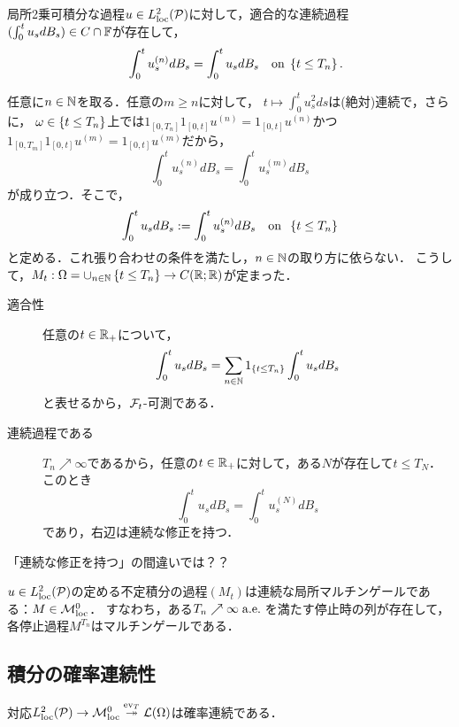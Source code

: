 \documentclass[uplatex,dvipdfmx]{jsreport}
\begin{document}
\begin{proposition}
    局所2乗可積分な過程$u\in L^2_{\mathrm{loc}}(\mathcal{P})$に対して，適合的な連続過程$(\int^t_0u_sdB_s)\in C\cap\mathbb{F}$が存在して，
    \[\quad\int^t_0u_s^{(n)}dB_s=\int^t_0u_sdB_s\quad\mathrm{on}\;\left\{t\le T_n\right\}.\]
\end{proposition}
\begin{Proof}
    任意に$n\in\mathbb{N}$を取る．任意の$m\ge n$に対して，
    $t\mapsto\int^t_0u_s^2ds$は(絶対)連続で，さらに，
    $\omega\in\left\{t\le T_n\right\}$上では$1_{[0,T_n]}1_{[0,t]}u^{(n)}=1_{[0,t]}u^{(n)}$かつ$1_{[0,T_m]}1_{[0,t]}u^{(m)}=1_{[0,t]}u^{(m)}$だから，
    \[\int^t_0u^{(n)}_sdB_s=\int^t_0u_s^{(m)}dB_s\]
    が成り立つ．そこで，
    \[\int^t_0u_sdB_s:=\int^t_0u_s^{(n)}dB_s\quad\mathrm{on}\;\;\left\{t\le T_n\right\}\]
    と定める．これ張り合わせの条件を満たし，$n\in\mathbb{N}$の取り方に依らない．
    こうして，$M_t:\Omega=\cup_{n\in\mathbb{N}}\left\{t\le T_n\right\}\to C(\mathbb{R};\mathbb{R})$が定まった．
    \begin{description}
        \item[適合性] 任意の$t\in\mathbb{R}_+$について，
        \[\int^t_0u_sdB_s=\sum_{n\in\mathbb{N}}1_{\left\{t\le T_n\right\}}\int^t_0u_sdB_s\]
        と表せるから，$\mathcal{F}_t$-可測である．
        \item[連続過程である]
        $T_n\nearrow \infty$であるから，任意の$t\in\mathbb{R}_+$に対して，ある$N$が存在して$t\le T_N$．このとき
        \[\int^t_0u_sdB_s=\int^t_0u^{(N)}_sdB_s\]
        であり，右辺は連続な修正を持つ．
    \end{description}
\end{Proof}
\begin{remarks}
    「連続な修正を持つ」の間違いでは？？
\end{remarks}

\begin{corollary}
    $u\in L^2_{\mathrm{loc}}(\mathcal{P})$の定める不定積分の過程$(M_t)$は連続な局所マルチンゲールである：$M\in\mathcal{M}^0_{\mathrm{loc}}$．
    すなわち，ある$T_n\nearrow\infty\;\mathrm{a.e.}\;$を満たす停止時の列が存在して，各停止過程$M^{T_n}$はマルチンゲールである．
\end{corollary}

\subsection{積分の確率連続性}

\begin{tcolorbox}[colframe=ForestGreen, colback=ForestGreen!10!white,breakable,colbacktitle=ForestGreen!40!white,coltitle=black,fonttitle=\bfseries\sffamily,
title=]
    対応$L^2_{\mathrm{loc}}(\mathcal{P})\to\mathcal{M}^0_{\mathrm{loc}}\overset{\mathrm{ev}_T}{\twoheadrightarrow}\mathcal{L}(\Omega)$は確率連続である．
\end{tcolorbox}
\end{document}
